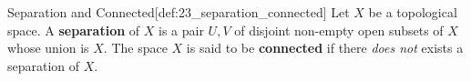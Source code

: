\begin{defBox}{Separation and Connected}[def:23_separation_connected]
    Let \( X \) be a topological space.
    A \textbf{separation} of \( X \) is a pair \( U, V \) of disjoint
    non-empty open subsets of \( X \) whose union is \( X \).
    The space \( X \) is said to be \textbf{connected} if there \textit{does 
    not} exists a separation of \( X \).
\end{defBox}